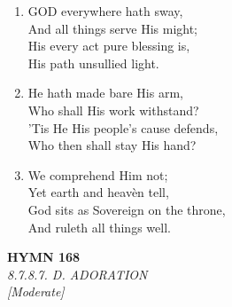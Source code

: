 \documentclass[11pt,a4paper]{article}
\begin{document}
\begin{enumerate}
    \item GOD everywhere hath sway, \\
        And all things serve His might; \\
        His every act pure blessing is, \\
        His path unsullied light.

    \item He hath made bare His arm, \\
        Who shall His work withstand? \\
        'Tis He His people's cause defends, \\
        Who then shall stay His hand?

    \item We comprehend Him not; \\
        Yet earth and heav\`en tell, \\
        God sits as Sovereign on the throne, \\
        And ruleth all things well.

\end{enumerate}

\newpage
\begin{center}
    {\Large \textbf{HYMN 168}}
    \\
    \textit{8.7.8.7. D. ADORATION}
    \\
    \textit{\small [Moderate]}
\end{center}
\vspace{1em}
\end{document}
